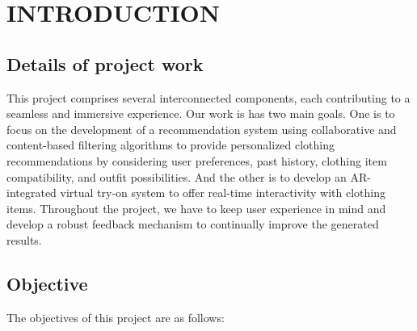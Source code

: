\chapter[Introduction]{INTRODUCTION}

\section{Details of project work}
	This project comprises several interconnected components, each contributing to a seamless and immersive experience. Our work is has two main goals. One is to focus on the development of a recommendation system using collaborative and content-based filtering algorithms to provide personalized clothing recommendations by considering user preferences, past history, clothing item compatibility, and outfit possibilities. And the other is to develop an AR-integrated virtual try-on system to offer real-time interactivity with clothing items. Throughout the project, we have to keep user experience in mind and develop a robust feedback mechanism to continually improve the generated results.

\section{Objective}
	The objectives of this project are as follows:

